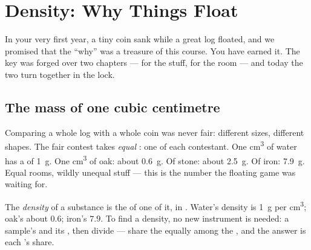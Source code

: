 \chapter{Density: Why Things Float}\label{ch:g6:density-floating}

In your very first year, a tiny coin sank while a great log
floated, and we promised that the ``why'' was a treasure of this
course. You have earned it. The key was forged over two chapters
---  for the stuff,  for the room --- and today the two
turn together in the lock.

\section{The mass of one cubic centimetre}

\begin{example}\label{ex:g6:density-floating:fair}
Comparing a whole log with a whole coin was never fair: different
sizes, different shapes. The fair contest takes \emph{equal
}: one  of each contestant. One
\unit{cm^3} of water has a  of \qty{1}{g}. One \unit{cm^3}
of oak: about \qty{0.6}{g}. Of stone: about \qty{2.5}{g}. Of
iron: \qty{7.9}{g}. Equal rooms, wildly unequal stuff --- this is
the number the floating game was waiting for.
\end{example}

\begin{definition}[Density]\label{def:g6:density-floating:density}
The \emph{density} of a substance is the  of
one  of it, in . Water's density is
\qty{1}{g} per \unit{cm^3}; oak's about $0.6$; iron's $7.9$. To
find a density, no new instrument is needed:  a sample's
 and its , then divide --- share the  equally
among the , and the answer is each 's
share.
\end{definition}

